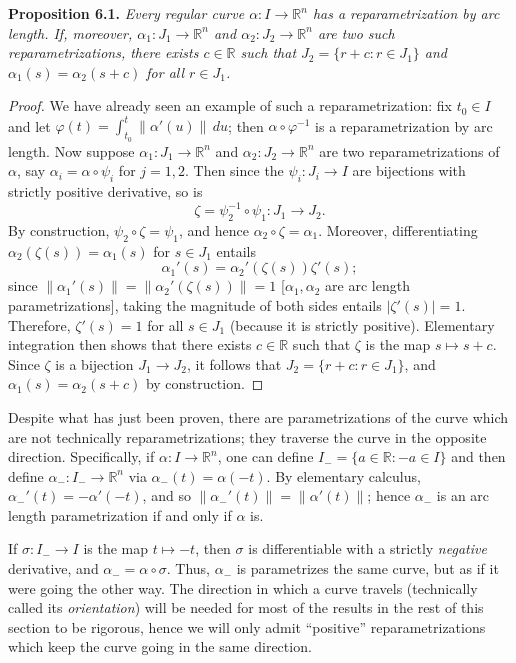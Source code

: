 \documentclass[leqno]{book}
\begin{document}
\noindent\textbf{Proposition 6.1.} \emph{Every regular curve $\alpha:I\to\mathbb R^n$ has a reparametrization by arc length.  If, moreover, $\alpha_1:J_1\to\mathbb R^n$ and $\alpha_2:J_2\to\mathbb R^n$ are two such reparametrizations, there exists $c\in\mathbb R$ such that $J_2=\{r+c:r\in J_1\}$ and $\alpha_1(s)=\alpha_2(s+c)$ for all $r\in J_1$.}
\begin{proof}
We have already seen an example of such a reparametrization: fix $t_0\in I$ and let $\varphi(t)=\int_{t_0}^t\|\alpha'(u)\|\,du$; then $\alpha\circ\varphi^{-1}$ is a reparametrization by arc length.  Now suppose $\alpha_1:J_1\to\mathbb R^n$ and $\alpha_2:J_2\to\mathbb R^n$ are two reparametrizations of $\alpha$, say $\alpha_i=\alpha\circ\psi_i$ for $j=1,2$.  Then since the $\psi_i:J_i\to I$ are bijections with strictly positive derivative, so is
$$\zeta=\psi_2^{-1}\circ\psi_1:J_1\to J_2.$$
By construction, $\psi_2\circ\zeta=\psi_1$, and hence $\alpha_2\circ\zeta=\alpha_1$.  Moreover, differentiating $\alpha_2(\zeta(s))=\alpha_1(s)$ for $s\in J_1$ entails
$$\alpha_1'(s)=\alpha_2'(\zeta(s))\zeta'(s);$$
since $\|\alpha_1'(s)\|=\|\alpha_2'(\zeta(s))\|=1$ [$\alpha_1,\alpha_2$ are arc length parametrizations], taking the magnitude of both sides entails $|\zeta'(s)|=1$.  Therefore, $\zeta'(s)=1$ for all $s\in J_1$ (because it is strictly positive).  Elementary integration then shows that there exists $c\in\mathbb R$ such that $\zeta$ is the map $s\mapsto s+c$.  Since $\zeta$ is a bijection $J_1\to J_2$, it follows that $J_2=\{r+c:r\in J_1\}$, and $\alpha_1(s)=\alpha_2(s+c)$ by construction.
\end{proof}

\noindent Despite what has just been proven, there are parametrizations of the curve which are not technically reparametrizations; they traverse the curve in the opposite direction.  Specifically, if $\alpha:I\to\mathbb R^n$, one can define $I_-=\{a\in\mathbb R:-a\in I\}$ and then define $\alpha_-:I_-\to\mathbb R^n$ via $\alpha_-(t)=\alpha(-t)$.  By elementary calculus, $\alpha_-'(t)=-\alpha'(-t)$, and so $\|\alpha_-'(t)\|=\|\alpha'(t)\|$; hence $\alpha_-$ is an arc length parametrization if and only if $\alpha$ is.

If $\sigma:I_-\to I$ is the map $t\mapsto -t$, then $\sigma$ is differentiable with a strictly \emph{negative} derivative, and $\alpha_-=\alpha\circ\sigma$.  Thus, $\alpha_-$ is parametrizes the same curve, but as if it were going the other way.  The direction in which a curve travels (technically called its \emph{orientation}) will be needed for most of the results in the rest of this section to be rigorous, hence we will only admit ``positive'' reparametrizations which keep the curve going in the same direction.\\
\end{document}
